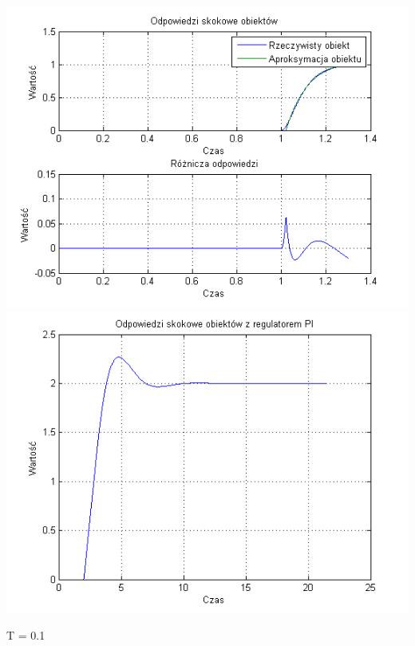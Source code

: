 \documentclass[10pt,a4paper]{article}
\begin{document}
\begin{center}
\includegraphics[scale=1]{images/jeden/skrypt_47.png}\\
\includegraphics[scale=1]{images/jeden/skrypt_48.png}\\
\end{center}
\newpage
T = 0.1
\end{document}
